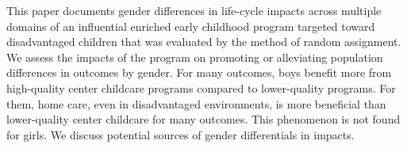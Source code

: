 \noindent This paper documents gender differences in life-cycle impacts across multiple domains of an influential enriched early childhood program targeted toward disadvantaged children that was evaluated by the method of random assignment. We assess the impacts of the program on promoting or alleviating population differences in outcomes by gender. For many outcomes, boys benefit more from high-quality center childcare programs compared to lower-quality programs. For them, home care, even in disadvantaged environments, is more beneficial than lower-quality center childcare for many outcomes. This phenomenon is not found for girls. We discuss potential sources of gender differentials in impacts. 